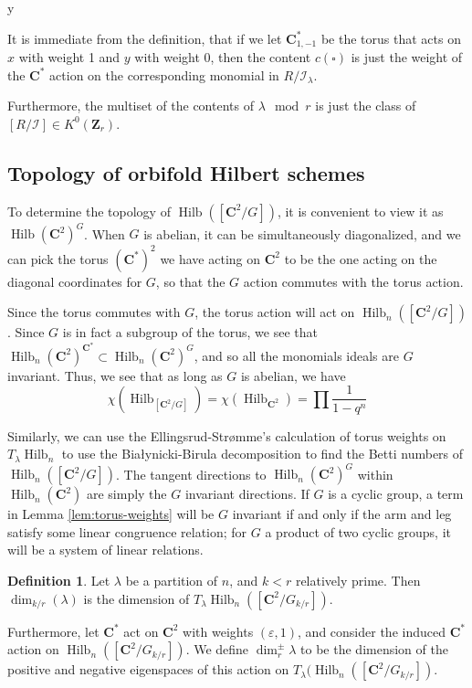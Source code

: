 y\documentclass{amsart}[12pt]
\theoremstyle{definition}
\newtheorem{definition}[dummy]{Definition}
\newcommand{\Z}{\mathbf{Z}}
\newcommand{\C}{\mathbf{C}}
\DeclareMathOperator{\Hilb}{Hilb}
\begin{document}
It is immediate from the definition, that if we let $\C^*_{1,-1}$ be the torus that acts on $x$ with weight 1 and $y$ with weight $0$, then the content $c(\square)$ is just the weight of the $\C^*$ action on the corresponding monomial in $R/\mathcal{I}_\lambda$.

Furthermore, the multiset of the contents of $\lambda \mod r$ is just the class of $[R/\mathcal{I}]\in K^0(\Z_r)$.


\subsection{Topology of orbifold Hilbert schemes}

To determine the topology of $\Hilb([\C^2/G])$, it is convenient to view it as $\Hilb(\C^2)^G$.  When $G$ is abelian, it can be simultaneously diagonalized, and we can pick the torus $(\C^*)^2$ we have acting on $\C^2$ to be the one acting on the diagonal coordinates for $G$, so that the $G$ action commutes with the torus action.  

Since the torus commutes with $G$, the torus action will act on $\Hilb_n([\C^2/G])$.  Since $G$ is in fact a subgroup of the torus, we see that $\Hilb_n(\C^2)^{\C^*}\subset\Hilb_n(\C^2)^G$, and so all the monomials ideals are $G$ invariant.  Thus, we see that as long as $G$ is abelian, we have
$$\chi(\Hilb_{[\C^2/G]})=\chi(\Hilb_{\C^2})=\prod\frac{1}{1-q^n}$$

Similarly, we can use the Ellingsrud-Str\o mme's calculation of torus weights on $T_\lambda\Hilb_n$ to use the Bia\l ynicki-Birula decomposition to find the Betti numbers of $\Hilb_n([\C^2/G])$.  The tangent directions to $\Hilb_n(\C^2)^G$ within $\Hilb_n(\C^2)$ are simply the $G$ invariant directions.  If $G$ is a cyclic group, a term in Lemma \ref{lem:torus-weights} will be $G$ invariant if and only if the arm and leg satisfy some linear congruence relation; for $G$ a product of two cyclic groups, it will be a system of linear relations.

\begin{definition}
Let $\lambda$ be a partition of $n$, and $k<r$ relatively prime.  Then $\dim_{k/r}(\lambda)$ is the dimension of $T_\lambda\Hilb_n([\C^2/G_{k/r}])$.

Furthermore, let $\C^*$ act on $\C^2$ with weights $(\varepsilon, 1)$, and consider the induced $\C^*$ action on $\Hilb_n([\C^2/G_{k/r}])$.  We define $\dim^{\pm}_r \lambda$ to be the dimension of the positive and negative eigenspaces of this action on $T_\lambda(\Hilb_n([\C^2/G_{k/r}])$. 
\end{definition}
\end{document}
